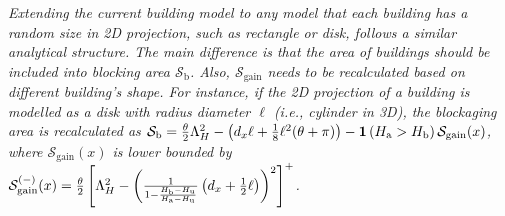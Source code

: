 \documentclass[12pt, draftclsnofoot, onecolumn]{IEEEtran}
\begin{document}
\begin{remark}\label{Remark:ExtendsionBuildingWithShape}
\emph{Extending the current building model to any model that each building has a random size in 2D projection, such as rectangle \cite{andrews2017modeling} or disk, follows a similar analytical structure. The main difference is that the area of buildings should be included into blocking area $\mathcal{S}_{\textrm{b}}$. Also, $\mathcal{S}_{\textrm{gain}}$ needs to be recalculated based on different building's shape. For instance, if the 2D projection of a building is modelled as a disk with radius diameter $\ell$ (i.e., cylinder in 3D), the blockaging area is recalculated as $\mathcal{S}_{\mathrm{b}} = \frac{\theta}{2}\Lambda_H^2 - \left(d_x\ell + \frac{1}{8}\ell^2(\theta+\pi) \right) - \mathbf{1}\left( H_{\textrm{a}} > H_{\textrm{b}} \right)\mathcal{S}_{\textrm{gain}}(x)$, where $\mathcal{S}_{\textrm{gain}}(x)$ is lower bounded by $\mathcal{S}_{\textrm{gain}}^{(-)}(x) = \frac{\theta}{2}\left[\Lambda_H^2 - \left( \frac{ 1 }{1 -  \frac{H_{\mathrm{b}} - H_{\mathrm{u}}}{H_{\mathrm{a}} - H_{\mathrm{u}}}}\left(d_x + \frac{1}{2}\ell \right) \right)^2\right]^{+}$. }
\end{remark}
\end{document}
